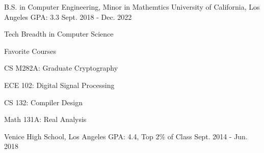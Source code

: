 

\begin{cventries}

  \cventry
    {B.S. in Computer Engineering, Minor in Mathemtics} %
    {University of California, Los Angeles} %
    {GPA: 3.3} %
    {Sept. 2018 - Dec. 2022} %
    {
       \begin{cvitems}
            \item Tech Breadth in Computer Science
           \item Favorite Courses \\
           \begin{cvitems}
            \item CS M282A: Graduate Cryptography
            \item ECE 102: Digital Signal Processing
            \item CS 132: Compiler Design
            \item Math 131A: Real Analysis
        \end{cvitems}
       \end{cvitems}
    }
    \par
    \;
    \cventry
        {}
        {Venice High School, Los Angeles}
        {GPA: 4.4, Top 2\% of Class}
        {Sept. 2014 - Jun. 2018}
        {
        }

    

\end{cventries}
